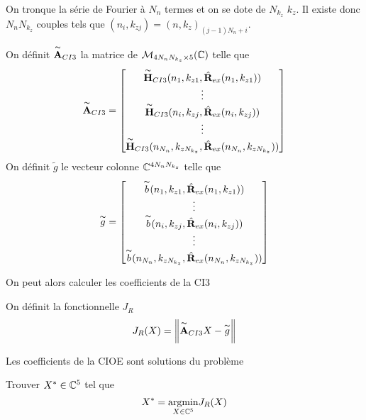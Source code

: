     On tronque la série de Fourier à \(N_{n}\) termes et on se dote de \(N_{k_z}\) \(k_z\). Il existe donc \(N_{n}N_{k_z}\) couples tels que \((n_i,k_{zj}) = (n,k_z)_{(j-1)N_{n}+i}\).
    \begin{defn}
      On définit \(\overset{\thicksim}{\mathbf{A}}_{CI3}\) la matrice de \(\mathcal{M}_{4N_{n}N_{k_z}\times5}(\mathbb C)\) telle que
      \begin{equation*}
        \overset{\thicksim}{\mathbf{A}}_{CI3} = 
        \begin{bmatrix}
          \overset{\thicksim}{\mathbf{H}}_{CI3}(n_1,k_{z1},\hat{\mathbf{R}}_{ex}(n_1,k_{z1}))
          \\
          \vdots
          \\
          \overset{\thicksim}{\mathbf{H}}_{CI3}(n_i,k_{zj},\hat{\mathbf{R}}_{ex}(n_i,k_{zj}))
          \\
          \vdots
          \\
          \overset{\thicksim}{\mathbf{H}}_{CI3}(n_{N_n},k_{zN_{k_z}},\hat{\mathbf{R}}_{ex}(n_{N_n},k_{zN_{k_z}}))
        \end{bmatrix}
      \end{equation*}
      On définit \(\tilde{g}\) le vecteur colonne \(\mathbb C^{4N_{n}N_{k_z}}\) telle que
      \begin{equation*}
        \overset{\thicksim}{g} = 
        \begin{bmatrix}
          \overset{\thicksim}{b}(n_1,k_{z1},\hat{\mathbf{R}}_{ex}(n_1,k_{z1}))
          \\
          \vdots
          \\
          \overset{\thicksim}{b}(n_i,k_{zj},\hat{\mathbf{R}}_{ex}(n_i,k_{zj}))
          \\
          \vdots
          \\
          \overset{\thicksim}{b}(n_{N_n},k_{zN_{k_z}},\hat{\mathbf{R}}_{ex}(n_{N_n},k_{zN_{k_z}}))
        \end{bmatrix}
      \end{equation*}
    \end{defn}

    On peut alors calculer les coefficients de la CI3

    \begin{defn}
      On définit la fonctionnelle \(J_R\)
      \begin{equation*}
        J_R(X) = \left\lVert\overset{\thicksim}{\mathbf{A}}_{CI3}X - \overset{\thicksim}{g}\right\rVert
      \end{equation*}
    \end{defn}

    \begin{thm}

      Les coefficients de la CIOE sont solutions du problème

      Trouver \(X^* \in \mathbb C^5\) tel que
      \begin{equation*}
        X^* = {\underset{X\in \mathbb C^5}{\operatorname{argmin}}} J_R(X)
      \end{equation*}
    \end{thm}

